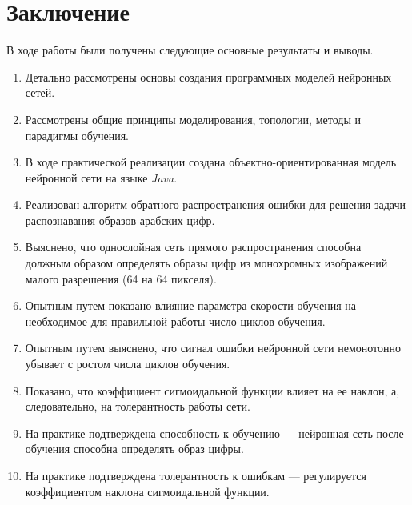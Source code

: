 \section*{\centering Заключение}

В ходе работы были получены следующие основные результаты и выводы.
\begin{enumerate}
\item Детально рассмотрены основы создания программных моделей нейронных сетей.

\item Рассмотрены общие принципы моделирования, топологии, методы и парадигмы обучения.

\item В ходе практической реализации создана объектно-ориентированная модель нейронной сети на языке {\it Java}.

\item Реализован алгоритм обратного распространения ошибки для решения задачи распознавания образов арабских цифр.

\item Выяснено, что однослойная сеть прямого распространения способна должным образом определять образы цифр из монохромных изображений малого разрешения (64 на 64 пикселя).

\item Опытным путем показано влияние параметра скорости обучения на необходимое для правильной работы число циклов обучения.

\item Опытным путем выяснено, что сигнал ошибки нейронной сети немонотонно убывает с ростом числа циклов обучения.

\item Показано, что коэффициент сигмоидальной функции влияет на ее наклон, а, следовательно, на толерантность работы сети.

\item На практике подтверждена способность к обучению --- нейронная сеть после обучения способна определять образ цифры.

\item На практике подтверждена толерантность к ошибкам --- регулируется коэффициентом наклона сигмоидальной функции.
\end{enumerate}

\newpage
